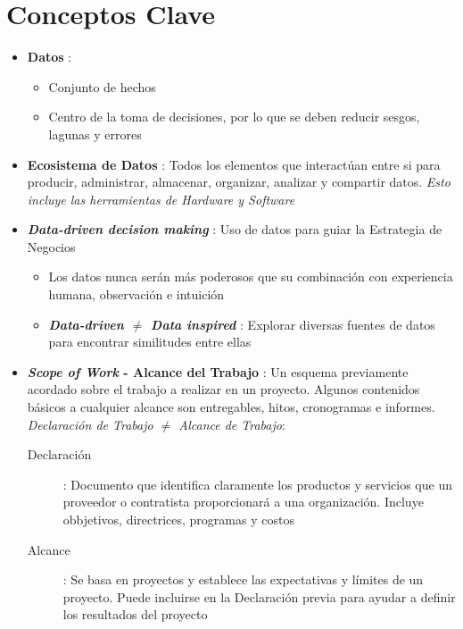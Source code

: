 \section{Conceptos Clave}
\begin{itemize}
    \item {\textbf{Datos} : 
    \begin{itemize}
        \item {Conjunto de hechos}
        \item {Centro de la toma de decisiones, por lo que se deben reducir sesgos, lagunas y errores}
    \end{itemize}}
    \item {\textbf{Ecosistema de Datos} : Todos los elementos que interactúan entre si para producir, administrar, almacenar, organizar, analizar y compartir datos. \textit{Esto incluye las herramientas de Hardware y Software}}
    \item {\textbf{\textit{Data-driven decision making}} : Uso de datos para guiar la Estrategia de Negocios 
    \begin{itemize}
        \item {Los datos nunca serán más poderosos que su combinación con experiencia humana, observación e intuición}
        \item {\textit{\textbf{Data-driven ${\neq}$ Data inspired}} : Explorar diversas fuentes de datos para encontrar similitudes entre ellas}
    \end{itemize}}
    \item {\textbf{\textit{Scope of Work} - Alcance del Trabajo} : Un esquema previamente acordado sobre el trabajo a realizar en un proyecto. Algunos contenidos básicos a cualquier alcance son entregables, hitos, cronogramas e informes. \textit{Declaración de Trabajo ${\neq}$ Alcance de Trabajo}:
    \begin{description}
        \item[Declaración]{ : Documento que identifica claramente los productos y servicios que un proveedor o contratista proporcionará a una organización. Incluye obbjetivos, directrices, programas y costos}
        \item[Alcance]{ : Se basa en proyectos y establece las expectativas y límites de un proyecto. Puede incluirse en la Declaración previa para ayudar a definir los resultados del proyecto}
    \end{description}}
\end{itemize}

